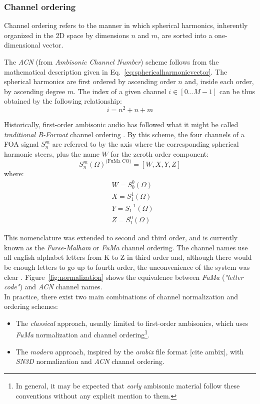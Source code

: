 \subsubsection{Channel ordering}

Channel ordering refers to the manner in which spherical harmonics, inherently organized in the 2D space by dimensions $n$ and $m$, are sorted into a one-dimensional vector. 

The \textit{ACN} (from \textit{Ambisonic Channel Number}) scheme follows from the mathematical description given in Eq.~\ref{eq:sphericalharmonicvector}. The spherical harmonics are first ordered by ascending order $n$ and, inside each order, by ascending degree $m$. The index of a given channel $i \in [0 \ldots M-1]$ can be thus obtained by the following relationship:
\begin{equation}
	i = n^2 + n + m 
\end{equation}

Historically, first-order ambisonic audio has followed what it might be called \textit{traditional B-Format} channel ordering \cite{gerzon1985ambisonics}. 
By this scheme, the four channels of a FOA signal $S_n^m$ are referred to by the axis where the corresponding spherical harmonic steers, plus the name $W$ for the zeroth order component:
\begin{equation}
	{S_n^m(\Omega)}^{\text{(FuMa CO)}} = [W, X, Y, Z]
\label{eq:fumaordering}
\end{equation}
where:
\begin{equation}
\begin{aligned}
	&W = S_0^0(\Omega) \\
	&X = S_1^1(\Omega) \\
	&Y = S_1^{-1}(\Omega) \\
	&Z = S_1^0(\Omega)
\end{aligned}	
\end{equation}

This nomenclature was extended to second and third order, and is currently known as the \textit{Furse-Malham} or \textit{FuMa} channel ordering. The channel names use all english alphabet letters from K to Z in third order and, although there would be enough letters to go up to fourth order, the unconvenience of the system was clear \cite{malham2003higher}.
Figure~\ref{fig:normalization} shows the equivalence between \textit{FuMa} (\textit{"letter code"}) and \textit{ACN} channel names.\\

\newpage
In practice, there exist two main combinations of channel normalization and ordering schemes:
\begin{itemize}
  \item The \textit{classical} approach, usually limited to first-order ambisonics, which uses \textit{FuMa} normalization and channel ordering\footnote{In general, it may be expected that \textit{early} ambisonic material follow these conventions without any explicit mention to them.}.
  \item The \textit{modern} approach, inspired by the \textit{ambix} file format [cite ambix], with \textit{SN3D} normalization and \textit{ACN} channel ordering.
\end{itemize}

